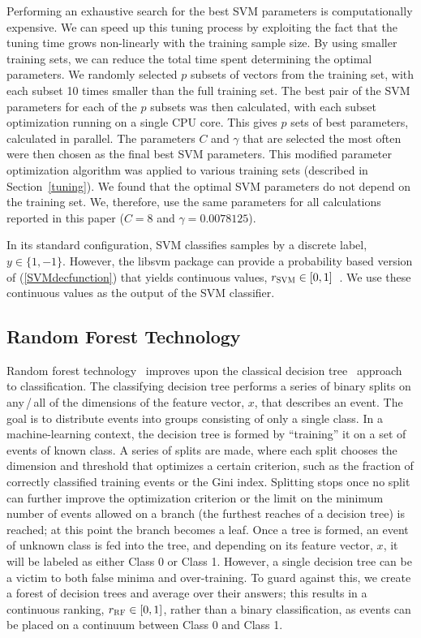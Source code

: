 \documentclass[prd, twocolumn, lengthcheck, superscriptaddress, showpacs, letterpaper, nofootinbib]{revtex4-1}
\newcommand\auxvec{x}
\newcommand\SVMrank{r_{\textsc{SVM}}}
\newcommand\RFrank{r_{\textsc{RF}}}
\begin{document}
Performing an exhaustive search for the best SVM parameters is computationally expensive. We can speed up this tuning process by exploiting the fact that the tuning time grows non-linearly with the training sample size. By using smaller training sets, we can reduce the total time spent determining the optimal parameters. We randomly selected $p$ subsets of vectors from the training set, with each subset 10 times smaller than the full training set. The best pair of the SVM parameters for each of the $p$ subsets was then calculated, with each subset optimization running on a single CPU core. This gives $p$ sets of best parameters, calculated in parallel. The parameters $C$ and $\gamma$ that are selected the most often were then chosen as the final best SVM parameters. This modified parameter optimization algorithm was applied to various training sets (described in  Section~\ref{tuning}). We found that the optimal SVM parameters do not depend on the training set. We, therefore, use the same parameters for all calculations reported in this paper ($C=8$ and $\gamma=0.0078125$).

In its standard configuration, SVM classifies samples by a discrete label, $y \in \{1, -1\}$. However, the libsvm package can provide a probability based version of (\ref{SVMdecfunction}) that yields continuous values, $\SVMrank \in [0, 1]$~\cite{Wu:2004}. We use these continuous values as the output of the SVM classifier.


\subsection{Random Forest Technology}
Random forest technology~\cite{Breiman:1996,Breiman01}  improves upon the classical decision tree~\cite{cart84,Quinlan86} approach to classification. The classifying decision tree performs a series of binary splits on any\,/\,all of the dimensions of the feature vector, $\auxvec$, that describes an event. The goal is to distribute events into groups consisting of only a single class. In a machine-learning context, the decision tree is formed by ``training'' it on a set of events of known class. A series of splits are made, where each split chooses the dimension and threshold that optimizes a certain criterion, such as the fraction of correctly classified training events or the Gini index. Splitting stops once no split can further improve the optimization criterion or the limit on the minimum number of events allowed on a branch (the furthest reaches of a decision tree) is reached; at this point the branch becomes a leaf. Once a tree is formed, an event of unknown class is fed into the tree, and depending on its feature vector, $\auxvec$, it will be labeled as either Class 0 or Class 1. However, a single decision tree can be a victim to both false minima and over-training. To guard against this, we create a forest of decision trees and average over their answers; this results in a continuous ranking, $\RFrank \in [0,1]$, rather than a binary classification, as events can be placed on a continuum between Class 0 and Class 1.
\end{document}
